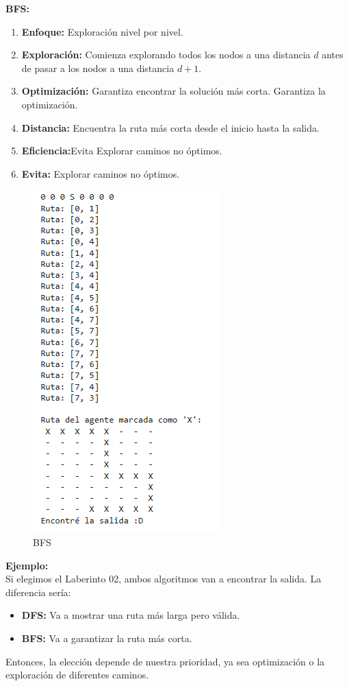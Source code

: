 {\large\textbf{BFS:}}

\begin{enumerate}
    \item \textbf{Enfoque:} Exploración nivel por nivel.
    \item \textbf{Exploración:} Comienza explorando todos los nodos a una 
    distancia \(d\) antes de pasar a los nodos a una distancia \(d+1\).
    \item \textbf{Optimización:} Garantiza encontrar la solución más corta. Garantiza la optimización.
    \item \textbf{Distancia:} Encuentra la ruta más corta desde el inicio hasta la salida.
    \item \textbf{Eficiencia:}Evita Explorar caminos no óptimos.
    \item \textbf{Evita:} Explorar caminos no óptimos.
\end{enumerate}

\begin{figure}[h]
    \centering
    \includegraphics[scale = .6]{IMA/captuBFS.png}
    \caption{BFS}
    \label{fig:enter-label}
\end{figure}
\vspace{0.5cm}

\textbf{Ejemplo:}\\

Si elegimos el Laberinto 02, ambos algoritmos van a encontrar la salida. La diferencia sería:

\begin{itemize}
    \item \textbf{DFS:} Va a mostrar una ruta más larga pero válida.
    \item \textbf{BFS:} Va a garantizar la ruta más corta.
\end{itemize}

Entonces, la elección depende de nuestra prioridad, ya sea optimización o la exploración 
de diferentes caminos.